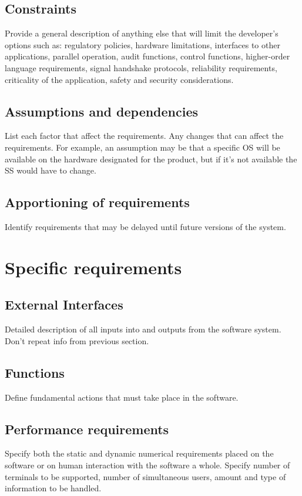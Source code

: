 \documentclass[letterpaper,10pt,draftclsnofoot,onecolumn,titlepage]{IEEEtran}
\begin{document}
	\subsection{Constraints}
	Provide a general description of anything else that will limit the developer's options such as: regulatory policies, hardware limitations, interfaces to other applications, parallel operation, audit functions, control functions, higher-order language requirements, signal handshake protocols, reliability requirements, criticality of the application, safety and security considerations.
	
	\subsection{Assumptions and dependencies} 
	List each factor that affect the requirements. 
	Any changes that can affect the requirements. 
	For example, an assumption may be that a specific OS will be available on the hardware designated for the product, but if it's not available the SS would have to change.
	
	\subsection{Apportioning of requirements}
	Identify requirements that may be delayed until future versions of the system.
	
	\section{Specific requirements}
	\subsection{External Interfaces}
	Detailed description of all inputs into and outputs from the software system. Don't repeat info from previous section.
	
	\subsection{Functions}
	Define fundamental actions that must take place in the software.
	
	\subsection{Performance requirements}
	Specify both the static and dynamic numerical requirements placed on the software or on human interaction with the software a whole.
	Specify number of terminals to be supported, number of simultaneous users, amount and type of information to be handled. 
	
\end{document}
